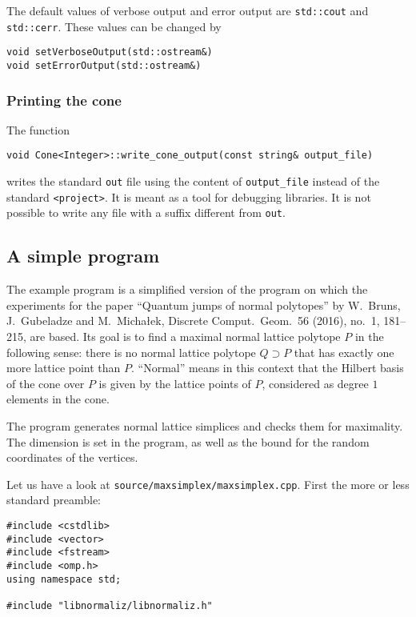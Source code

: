 \documentclass[12pt,a4paper]{scrartcl}
\theoremstyle{definition}
\begin{document}
\begin{small}
The default values of verbose output and error output are \verb|std::cout| and \verb|std::cerr|. These values can be changed by
\begin{Verbatim}
void setVerboseOutput(std::ostream&)
void setErrorOutput(std::ostream&)
\end{Verbatim}

\subsubsection{Printing the cone}

The function
\begin{Verbatim}
void Cone<Integer>::write_cone_output(const string& output_file)
\end{Verbatim}

writes the standard \verb|out| file using the content of \verb|output_file| instead of the standard \verb|<project>|. It is meant as a tool for debugging libraries. It is not possible to write any file with a suffix different from \verb|out|.

\subsection{A simple program}\label{maxsimplex}

The example program is a simplified version of the program on which the experiments for the paper ``Quantum jumps of normal polytopes'' by W.~Bruns, J.~Gubeladze and M.~Micha\l{}ek, Discrete Comput.\ Geom.\ 56 (2016), no.\ 1, 181--215, are based. Its goal is to find a maximal normal lattice polytope $P$ in the following sense: there is no normal lattice polytope $Q\supset P$ that has exactly one more lattice point than $P$. ``Normal'' means in this context that the Hilbert basis of the cone over $P$ is given by the lattice points of $P$, considered as degree $1$ elements in the cone.

The program generates normal lattice simplices and checks them for maximality. The dimension is set in the program, as well as the bound for the random coordinates of the vertices.

Let us have a look at \verb|source/maxsimplex/maxsimplex.cpp|. First the more or less standard preamble:

\begin{Verbatim}
#include <cstdlib>
#include <vector>
#include <fstream>
#include <omp.h>
using namespace std;

#include "libnormaliz/libnormaliz.h"
\end{Verbatim}


\end{small}
\end{document}

